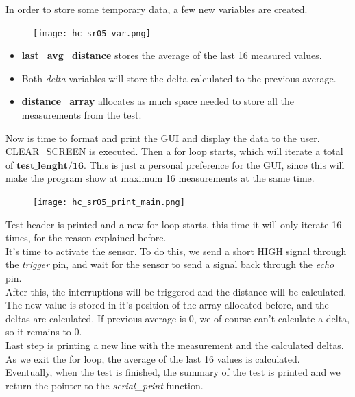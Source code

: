 \documentclass[14pt]{article}
\begin{document}
\begin{normalsize}
		In order to store some temporary data, a few new variables are created.\\
		\setlength{\intextsep}{-5pt}
		\begin{figure}
			\texttt{[image: hc\_sr05\_var.png]}
		\end{figure}\vspace{-25pt}
		\begin{itemize}
			\item \textbf{last\_avg\_distance} stores the average of the last 16 measured values.
			\item Both \textit{delta} variables will store the delta calculated to the previous average.
			\item \textbf{distance\_array} allocates as much space needed to store all the measurements from the test.
		\end{itemize}
		Now is time to format and print the GUI and display the data to the user. CLEAR\_SCREEN is executed. Then a for loop starts, which will iterate a total of $\boldsymbol{test\_lenght/16}$. This is just a personal preference for the GUI, since this will make the program show at maximum 16 measurements at the same time.
		\setlength{\intextsep}{0pt}
		\begin{figure}
			\texttt{[image: hc\_sr05\_print\_main.png]}
		\end{figure}
		Test header is printed and a new for loop starts, this time it will only iterate 16 times, for the reason explained before.\\
		
		\noindent It's time to activate the sensor. To do this, we send a short HIGH signal through the \textit{trigger} pin, and wait for the sensor to send a signal back through the \textit{echo} pin.\\
		
		\noindent After this, the interruptions will be triggered and the distance will be calculated. The new value is stored in it's position of the array allocated before, and the deltas are calculated. If previous average is 0, we of course can't calculate a delta, so it remains to 0.\\
		
		\noindent Last step is printing a new line with the measurement and the calculated deltas. As we exit the for loop, the average of the last 16 values is calculated.\\
		
		Eventually, when the test is finished, the summary of the test is printed and we return the pointer to the \textit{serial\_print} function.

\end{normalsize}
\end{document}

